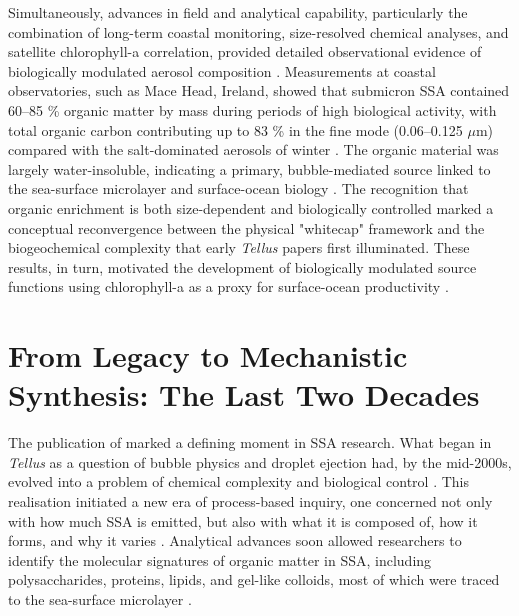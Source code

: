 \documentclass[ProofPDF]{./Styles/Jnls-Template-V3}
\begin{document}
Simultaneously, advances in field and analytical capability, particularly the combination of long-term coastal monitoring, size-resolved chemical analyses, and satellite chlorophyll-a correlation, provided detailed observational evidence of biologically modulated aerosol composition \citep{odowd2004}. Measurements at coastal observatories, such as Mace Head, Ireland, showed that submicron SSA contained 60–85 \% organic matter by mass during periods of high biological activity, with total organic carbon contributing up to 83 \% in the fine mode (0.06–0.125 $\mu$m) compared with the salt-dominated aerosols of winter \citep{odowd2004}. The organic material was largely water-insoluble, indicating a primary, bubble-mediated source linked to the sea-surface microlayer and surface-ocean biology \citep{Facchini2008}. The recognition that organic enrichment is both size-dependent and biologically controlled marked a conceptual reconvergence between the physical "whitecap" framework and the biogeochemical complexity that early \textit{Tellus} papers first illuminated. These results, in turn, motivated the development of biologically modulated source functions using chlorophyll-a as a proxy for surface-ocean productivity \citep{odowd2008,Russell2010}.

\section{From Legacy to Mechanistic Synthesis: The Last Two Decades}

The publication of \citet{odowd2004} marked a defining moment in SSA research. What began in \textit{Tellus} as a question of bubble physics and droplet ejection had, by the mid-2000s, evolved into a problem of chemical complexity and biological control \citep{DeLeeuw2011}. This realisation initiated a new era of process-based inquiry, one concerned not only with how much SSA is emitted, but also with what it is composed of, how it forms, and why it varies \citep{Quinn2015}. Analytical advances soon allowed researchers to identify the molecular signatures of organic matter in SSA, including polysaccharides, proteins, lipids, and gel-like colloids, most of which were traced to the sea-surface microlayer \citep{Bertram2018}.
\end{document}
